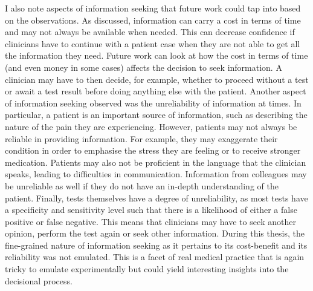 \documentclass[a4paper, nobind]{templates/ociamthesis}
\begin{document}
\hfill\break
I also note aspects of information seeking that future work could tap into based on the observations. As discussed, information can carry a cost in terms of time and may not always be available when needed. This can decrease confidence if clinicians have to continue with a patient case when they are not able to get all the information they need. Future work can look at how the cost in terms of time (and even money in some cases) affects the decision to seek information. A clinician may have to then decide, for example, whether to proceed without a test or await a test result before doing anything else with the patient. Another aspect of information seeking observed was the unreliability of information at times. In particular, a patient is an important source of information, such as describing the nature of the pain they are experiencing. However, patients may not always be reliable in providing information. For example, they may exaggerate their condition in order to emphasise the stress they are feeling or to receive stronger medication. Patients may also not be proficient in the language that the clinician speaks, leading to difficulties in communication. Information from colleagues may be unreliable as well if they do not have an in-depth understanding of the patient. Finally, tests themselves have a degree of unreliability, as most tests have a specificity and sensitivity level such that there is a likelihood of either a false positive or false negative. This means that clinicians may have to seek another opinion, perform the test again or seek other information. During this thesis, the fine-grained nature of information seeking as it pertains to its cost-benefit and its reliability was not emulated. This is a facet of real medical practice that is again tricky to emulate experimentally but could yield interesting insights into the decisional process.
\end{document}
